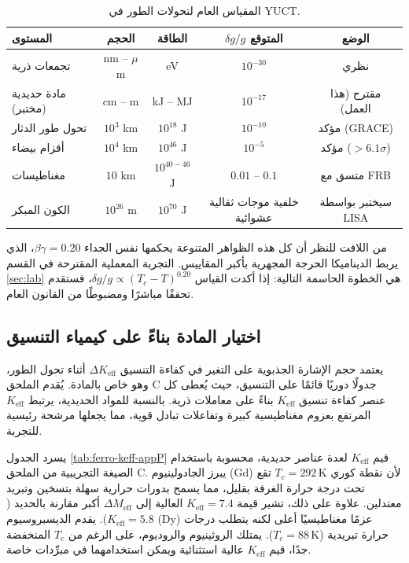 \documentclass[11pt,a4paper]{article}
\newcommand{\Keff}{K_{\mathrm{eff}}}
\begin{document}
	\begin{table}[htbp]
		\centering
		\caption{المقياس العام لتحولات الطور في YUCT.}
		\label{tab:scale}
		\small
		\begin{tabular}{lcccc}
			\toprule
			\textbf{المستوى} & \textbf{الحجم} & \textbf{الطاقة} & \(\delta g/g\) \textbf{المتوقع} & \textbf{الوضع} \\
			\midrule
			تجمعات ذرية & nm – $\mu$m & eV & $10^{-30}$ & نظري \\
			مادة حديدية (مختبر) & cm – m & kJ – MJ & $10^{-17}$ & مقترح (هذا العمل) \\
			تحول طور الدثار & $10^3$ km & $10^{18}$ J & $10^{-10}$ & مؤكد (GRACE) \\
			أقزام بيضاء & $10^4$ km & $10^{46}$ J & $10^{-5}$ & مؤكد ($>6.1\sigma$) \\
			مغناطيسات & $10$ km & $10^{40-46}$ J & $0.01$ – $0.1$ & متسق مع FRB \\
			الكون المبكر & $10^{26}$ m & $10^{70}$ J & خلفية موجات ثقالية عشوائية & سيختبر بواسطة LISA \\
			\bottomrule
		\end{tabular}
	\end{table}
	
	من اللافت للنظر أن كل هذه الظواهر المتنوعة يحكمها نفس الجداء $\beta\gamma = 0.20$، الذي يربط الديناميكا الحرجة المجهرية بأكبر المقاييس. التجربة المعملية المقترحة في القسم \ref{sec:lab} هي الخطوة الحاسمة التالية: إذا أكدت القياس $\delta g/g \propto (T_c - T)^{0.20}$، فستقدم تحققًا مباشرًا ومضبوطًا من القانون العام.
	
	\subsection{اختيار المادة بناءً على كيمياء التنسيق}
	\label{subsec:material-choice}
	
	يعتمد حجم الإشارة الجذبوية على التغير في كفاءة التنسيق $\Delta \Keff$ أثناء تحول الطور، وهو خاص بالمادة. يُقدم الملحق C جدولًا دوريًا قائمًا على التنسيق، حيث يُعطى كل عنصر كفاءة تنسيق $\Keff$ بناءً على معاملات ذرية. بالنسبة للمواد الحديدية، يرتبط $\Keff$ المرتفع بعزوم مغناطيسية كبيرة وتفاعلات تبادل قوية، مما يجعلها مرشحة رئيسية للتجربة.
	
	يسرد الجدول \ref{tab:ferro-keff-appP} قيم $\Keff$ لعدة عناصر حديدية، محسوبة باستخدام الصيغة التجريبية من الملحق C. يبرز الجادولينيوم (Gd) لأن نقطة كوري $T_c = 292\,\mathrm{K}$ تقع تحت درجة حرارة الغرفة بقليل، مما يسمح بدورات حرارية سهلة بتسخين وتبريد معتدلين. علاوة على ذلك، تشير قيمة $\Keff = 7.4$ العالية إلى $\Delta M_{\mathrm{eff}}$ أكبر مقارنة بالحديد ($\Keff = 5.8$). يقدم الديسبروسيوم (Dy) عزمًا مغناطيسيًا أعلى لكنه يتطلب درجات حرارة تبريدية ($T_c = 88\,\mathrm{K}$). يمتلك الروثينيوم والروديوم، على الرغم من $T_c$ المنخفضة جدًا، قيم $\Keff$ عالية استثنائية ويمكن استخدامهما في مبرِّدات خاصة.
	
\end{document}
